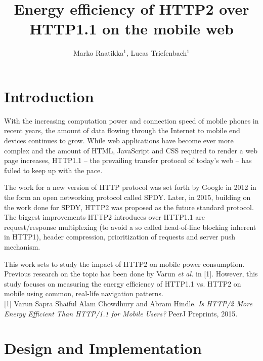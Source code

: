 \documentclass[noback]{cuposter}
\begin{document}
\newcommand{\don}{\ensuremath{d_{\textsc{ON}}}}
\newcommand{\doff}{\ensuremath{d_{\textsc{OFF}}}}
\newcommand{\dsoma}{\ensuremath{d_{\textsc{SOMA}}} \xspace}
\newcommand{\um}{\ensuremath{\mu \text{m}}\xspace}
\newcommand{\dmin}{d$_{\textup{min}}$\xspace}

\title{Energy efficiency of HTTP2 over HTTP1.1 on the mobile web}
\author{Marko Raatikka$^1$, Lucas Triefenbach$^1$}
\address{$^1$Aalto University School of Science, Espoo, Finland}

\makeposter

\section{Introduction}

With the increasing computation power and connection speed of mobile phones in recent years, the amount of data flowing through the Internet to mobile end devices continues to grow. While web applications have become ever more complex and the amount of HTML, JavaScript and CSS required to render a web page increases, HTTP1.1 -- the prevailing transfer protocol of today’s web -- has failed to keep up with the pace. 

The work for a new version of HTTP protocol was set forth by Google in 2012 in the form an open networking protocol called SPDY. Later, in 2015, building on the work done for SPDY, HTTP2 was proposed as the future standard protocol. The biggest improvements HTTP2 introduces over HTTP1.1 are request/response multiplexing (to avoid a so called head-of-line blocking inherent in HTTP1), header compression, prioritization of requests and server push mechanism. 

This work sets to study the impact of HTTP2 on mobile power consumption. Previous research on the topic has been done by Varun \emph{et al.} in [1]. However, this study focuses on measuring the energy efficiency of HTTP1.1 vs. HTTP2 on mobile using common, real-life navigation patterns.\\

\footnotesize{[1] Varun Sapra Shaiful Alam Chowdhury and Abram Hindle. \emph{Is HTTP/2 More Energy Efficient Than HTTP/1.1 for Mobile Users?} PeerJ Preprints, 2015.}

\vspace{-10mm}
\normalsize{}
\section{Design and Implementation}
\end{document}
